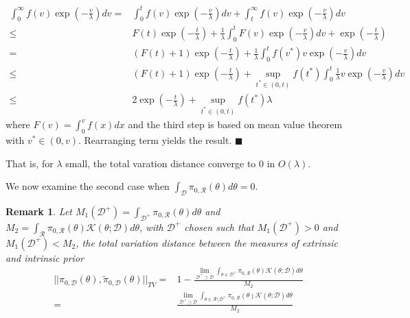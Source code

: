 \documentclass[10pt]{article}
\newtheorem{remark}{Remark}
\newcommand{\mc}[1]{\mathcal{#1}}
\DeclareMathOperator{\1}{\mathbbm{1}}
\begin{document}
\begin{equation}
\begin{aligned}
\int_0^\infty {f(v)} \exp(- \frac{v}{\lambda}) d v
= & \int_0^t {f(v)} \exp(- \frac{v}{\lambda}) d v + \int_t^\infty {f(v)} \exp(- \frac{v}{\lambda}) d v \\
\le & {F(t)} \exp(-\frac{t}{\lambda}) + 
\frac{1}{\lambda}\int_0^t {F(v)} \exp(-\frac{v}{\lambda})dv + \exp(-\frac{t}{\lambda}) \\
= & ({F(t)} +1) \exp(-\frac{t}{\lambda}) + 
\frac{1}{\lambda}\int_0^t {f(v^*)} v\exp(-\frac{v}{\lambda})dv \\
\le & ({F(t)} +1) \exp(-\frac{t}{\lambda}) + \sup_{t^*\in(0,t)} {f(t^*)}
\int_0^t  \frac{1}{\lambda}v\exp(-\frac{v}{\lambda})dv \\
\le & 2 \exp(-\frac{t}{\lambda}) + \sup_{t^*\in(0,t)} {f(t^*)}\lambda 
\end{aligned}
\end{equation}
where $F(v)=\int_0^v f(x)dx$ and the third step is based on mean value theorem with $v^*\in (0,v)$. Rearranging term yields the result.  $\blacksquare$

That is, for $\lambda$ small, the total varation distance converge to $0$ in $O(\lambda)$. 

We now examine the second case when ${ \int_{\mc D} \pi_{0,\mc R}(\theta)d\theta }=0$.


\begin{remark}
Let $M_1(\mc D^+)= \int_{\mc D^+} \pi_{0,\mc R}(\theta)d\theta$ and $M_2 = \int_{\mc R} \pi_{0,\mc R}(\theta) \mc K(\theta;\mc D)d\theta$, with $\mc D^+$ chosen such that $M_1(\mc D^+)>0$ and $M_1(\mc D^+)<M_2$, the total variation distance between the measures of extrinsic and intrinsic prior
\begin{equation}
\begin{aligned}
||\pi_{0,\mc D}(\theta), \tilde{\pi}_{0,\mc D}      (\theta) ||_{TV} = &1 - \frac{\lim_{\mc D^+\supset \mc D}\int_{\theta  \in \mc D^+} \pi_{0,\mc R}(\theta) \mc K(\theta;\mc D)d\theta}{M_2} \\
= &\frac{\lim_{\mc D^+\supset \mc D}\int_{\theta  \in \mc R \setminus \mc D^+} \pi_{0,\mc R}(\theta) \mc K(\theta;\mc D)d\theta}{M_2}
	\end{aligned}
\end{equation}
\end{remark}




\end{document}
